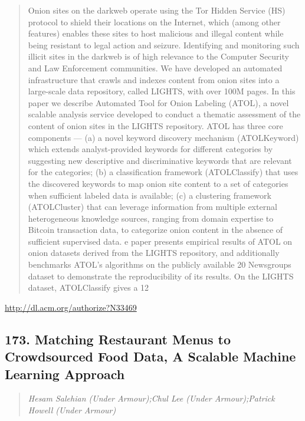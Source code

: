 \documentclass{article}
\begin{document}
\begin{quote}
Onion sites on the darkweb operate using the Tor Hidden Service (HS) protocol to shield their locations on the Internet, which (among other features) enables these sites to host malicious and illegal content while being resistant to legal action and seizure. Identifying and monitoring such illicit sites in the darkweb is of high relevance to the Computer Security and Law Enforcement communities. We have developed an automated infrastructure that crawls and indexes content from onion sites into a large-scale data repository, called LIGHTS, with over 100M pages. In this paper we describe Automated Tool for Onion Labeling (ATOL), a novel scalable analysis service developed to conduct a thematic assessment of the content of onion sites in the LIGHTS repository. ATOL has three core components — (a) a novel keyword discovery mechanism (ATOLKeyword) which extends analyst-provided keywords for different categories by suggesting new descriptive and discriminative keywords that are relevant for the categories; (b) a classification framework (ATOLClassify) that uses the discovered keywords to map onion site content to a set of categories when sufficient labeled data is available; (c) a clustering framework (ATOLCluster) that can leverage information from multiple external heterogeneous knowledge sources, ranging from domain expertise to Bitcoin transaction data, to categorize onion content in the absence of sufficient supervised data. e paper presents empirical results of ATOL on onion datasets derived from the LIGHTS repository, and additionally benchmarks ATOL’s algorithms on the publicly available 20 Newsgroups dataset to demonstrate the reproducibility of its results. On the LIGHTS dataset, ATOLClassify gives a 12%
\end{quote}

\href{http://dl.acm.org/authorize?N33469}{http://dl.acm.org/authorize?N33469}

\subsection{173. Matching Restaurant Menus to Crowdsourced Food Data, A Scalable Machine Learning Approach}

\begin{quote}
\footnotesize{\textit{Hesam Salehian (Under Armour);Chul Lee (Under Armour);Patrick Howell (Under Armour)}}

\end{quote}
\end{document}
